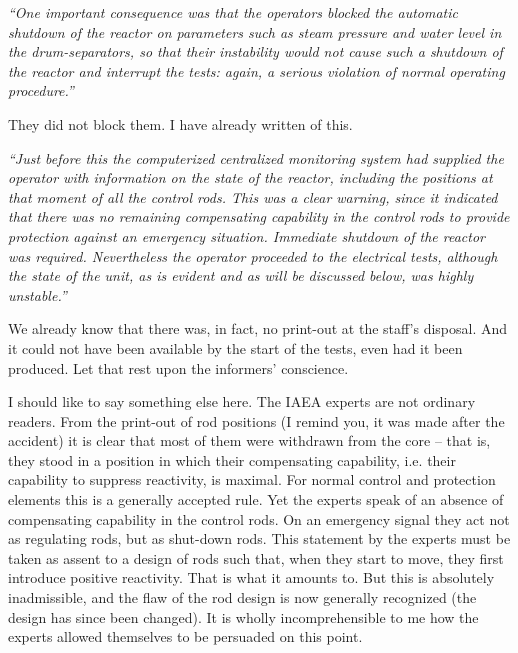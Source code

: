 \documentclass[openright]{bookest}
\begin{document}
\begin{personal}
\textit{``One important consequence was that the operators blocked the automatic shutdown of the reactor on parameters such as steam pressure and water level in the drum-separators, so that their instability would not cause such a shutdown of the reactor and interrupt the tests: again, a serious violation of normal operating procedure.''}
\end{personal}

They did not block them. I have already written of this.

\begin{personal}
\textit{``Just before this the computerized centralized monitoring system had supplied the operator with information on the state of the reactor, including the positions at that moment of all the control rods. This was a clear warning, since it indicated that there was no remaining compensating capability in the control rods to provide protection against an emergency situation. Immediate shutdown of the reactor was required. Nevertheless the operator proceeded to the electrical tests, although the state of the unit, as is evident and as will be discussed below, was highly unstable.''}
\end{personal}

We already know that there was, in fact, no print-out at the staff's disposal. And it could not have been available by the start of the tests, even had it been produced. Let that rest upon the informers' conscience.

I should like to say something else here. The IAEA experts are not ordinary readers. From the print-out of rod positions (I remind you, it was made after the accident) it is clear that most of them were withdrawn from the core -- that is, they stood in a position in which their compensating capability, i.e. their capability to suppress reactivity, is maximal. For normal control and protection elements this is a generally accepted rule. Yet the experts speak of an absence of compensating capability in the control rods. On an emergency signal they act not as regulating rods, but as shut-down rods. This statement by the experts must be taken as assent to a design of rods such that, when they start to move, they first introduce positive reactivity. That is what it amounts to. But this is absolutely inadmissible, and the flaw of the rod design is now generally recognized (the design has since been changed). It is wholly incomprehensible to me how the experts allowed themselves to be persuaded on this point.
\end{document}
